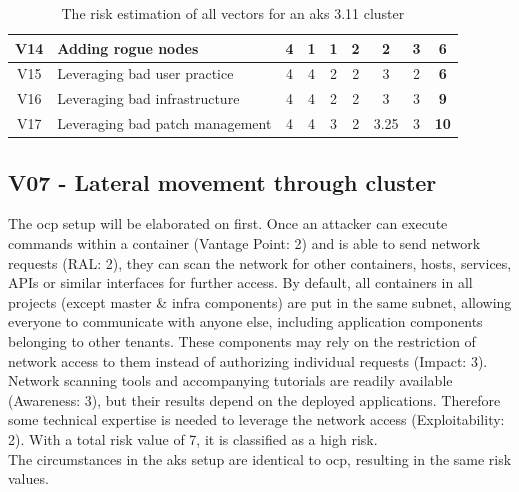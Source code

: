 \begin{landscape}
\begin{table}[]
{\begin{tabular}{|c|l|cccc|cc|c|}
V14             & Adding rogue nodes                                                                     & 4                                        & 1                              & 1                                        & 2                    & 2                                      & 3            & \textbf{6}           \\ \hline
V15             & Leveraging bad user practice                                                           & 4                                        & 4                              & 2                                        & 2                    & 3                                      & 2            & \textbf{6}           \\ \hline
V16             & Leveraging bad infrastructure                                                          & 4                                        & 4                              & 2                                        & 2                    & 3                                      & 3            & \textbf{9}           \\ \hline
V17             & Leveraging bad patch management                                                        & 4                                        & 4                              & 3                                        & 2                    & 3.25                                   & 3            & \textbf{10}          \\ \hline
\end{tabular}%
}
\caption{The risk estimation of all vectors for an \gls{aks} 3.11 cluster\label{aksRiskTable}}
\end{table}
\end{landscape}

\subsection{V07 - Lateral movement through cluster}

The \gls{ocp} setup will be elaborated on first. Once an attacker can execute commands within a container (Vantage Point: 2) and is able to send network requests (RAL: 2), they can scan the network for other containers, hosts, services, APIs or similar interfaces for further access. By default, all containers in all projects (except master \& infra components) are put in the same subnet, allowing everyone to communicate with anyone else, including application components belonging to other tenants. These components may rely on the restriction of network access to them instead of authorizing individual requests (Impact: 3).
Network scanning tools and accompanying tutorials are readily available (Awareness: 3), but their results depend on the deployed applications. Therefore some technical expertise is needed to leverage the network access (Exploitability: 2). 
With a total risk value of 7, it is classified as a high risk. \\
The circumstances in the \gls{aks} setup are identical to \gls{ocp}, resulting in the same risk values.

